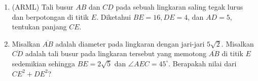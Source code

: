 \documentclass[12pt]{scrartcl}
\begin{document}
\begin{enumerate}[resume]
\item (ARML) Tali busur $AB$ dan $CD$ pada sebuah lingkaran saling tegak lurus dan berpotongan di titik $E$. Diketahui $BE = 16, DE = 4$, dan $AD = 5$, tentukan panjang $CE$.

\item Misalkan $\overline{AB}$ adalah diameter pada lingkaran dengan jari-jari $5\sqrt{2}$. Misalkan $\overline{CD}$ adalah tali busur pada lingkaran tersebut yang memotong $\overline{AB}$ di titik $E$ sedemikian sehingga $BE = 2\sqrt{5}$ dan $\angle AEC = 45^\circ$. Berapakah nilai dari $CE^2 + DE^2$?

\end{enumerate}
\end{document}
